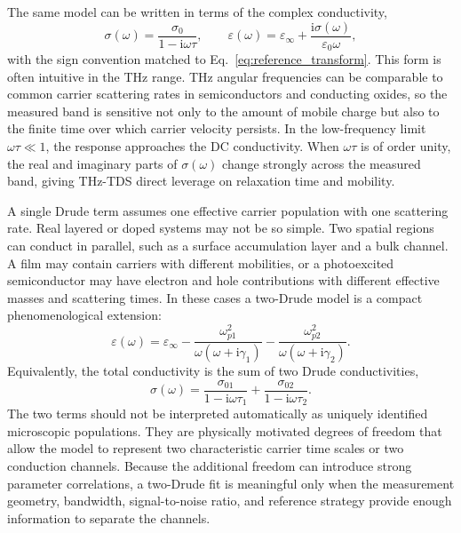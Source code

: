 \documentclass[11pt]{article}
\newcommand{\eps}{\varepsilon}
\newcommand{\epsinf}{\varepsilon_{\infty}}
\newcommand{\ii}{\mathrm{i}}
\begin{document}
The same model can be written in terms of the complex conductivity,
\begin{equation}
  \sigma(\omega)
  =
  \frac{\sigma_0}{1-\ii\omega\tau},
  \qquad
  \eps(\omega)
  =
  \epsinf+\frac{\ii\sigma(\omega)}{\varepsilon_0\omega},
  \label{eq:drude_conductivity}
\end{equation}
with the sign convention matched to Eq.~\eqref{eq:reference_transform}. This form is often intuitive in the THz range. THz angular frequencies can be comparable to common carrier scattering rates in semiconductors and conducting oxides, so the measured band is sensitive not only to the amount of mobile charge but also to the finite time over which carrier velocity persists. In the low-frequency limit \(\omega\tau\ll 1\), the response approaches the DC conductivity. When \(\omega\tau\) is of order unity, the real and imaginary parts of \(\sigma(\omega)\) change strongly across the measured band, giving THz-TDS direct leverage on relaxation time and mobility.

A single Drude term assumes one effective carrier population with one scattering rate. Real layered or doped systems may not be so simple. Two spatial regions can conduct in parallel, such as a surface accumulation layer and a bulk channel. A film may contain carriers with different mobilities, or a photoexcited semiconductor may have electron and hole contributions with different effective masses and scattering times. In these cases a two-Drude model is a compact phenomenological extension:
\begin{equation}
  \eps(\omega)
  =
  \epsinf
  -
  \frac{\omega_{p1}^2}{\omega(\omega+\ii\gamma_1)}
  -
  \frac{\omega_{p2}^2}{\omega(\omega+\ii\gamma_2)} .
  \label{eq:two_drude_permittivity}
\end{equation}
Equivalently, the total conductivity is the sum of two Drude conductivities,
\begin{equation}
  \sigma(\omega)
  =
  \frac{\sigma_{01}}{1-\ii\omega\tau_1}
  +
  \frac{\sigma_{02}}{1-\ii\omega\tau_2}.
  \label{eq:two_drude_conductivity}
\end{equation}
The two terms should not be interpreted automatically as uniquely identified microscopic populations. They are physically motivated degrees of freedom that allow the model to represent two characteristic carrier time scales or two conduction channels. Because the additional freedom can introduce strong parameter correlations, a two-Drude fit is meaningful only when the measurement geometry, bandwidth, signal-to-noise ratio, and reference strategy provide enough information to separate the channels.
\end{document}
